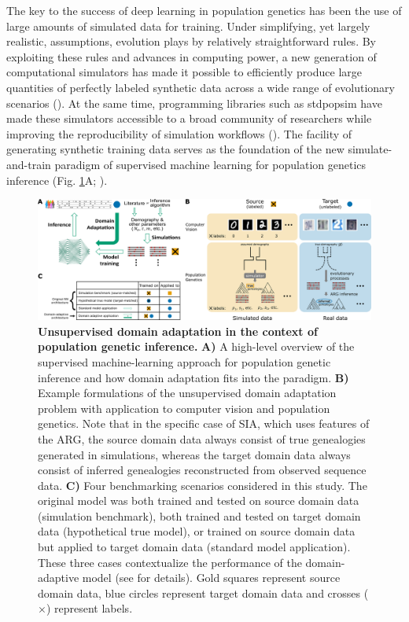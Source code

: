 The key to the success of deep learning in population genetics has been the use of large amounts of simulated data for training. Under simplifying, yet largely realistic, assumptions, evolution plays by relatively straightforward rules. By exploiting these rules and advances in computing power, a new generation of computational simulators has made it possible to efficiently produce large quantities of perfectly labeled synthetic data across a wide range of evolutionary scenarios (\cite{haller_tree-sequence_2019,haller_slim_2019,baumdicker_efficient_2022}). At the same time, programming libraries such as stdpopsim have made these simulators accessible to a broad community of researchers while improving the reproducibility of simulation workflows (\cite{adrion_community-maintained_2020,lauterbur_expanding_2022}). The facility of generating synthetic training data serves as the foundation of the new simulate-and-train paradigm of supervised machine learning for population genetics inference (Fig. \ref{fig:DA-F1}A; \cite{schrider_supervised_2018,korfmann_deep_2023,huang_harnessing_2023}).

\begin{figure}[h]
    \centering
    \includegraphics[width=\textwidth]{DA_figs/DA_F1.PNG}
    \caption[Unsupervised domain adaptation in the context of population genetic inference.]{\textbf{Unsupervised domain adaptation in the context of population genetic inference.} \textbf{A)} A high-level overview of the supervised machine-learning approach for population genetic inference and how domain adaptation fits into the paradigm. \textbf{B)} Example formulations of the unsupervised domain adaptation problem with application to computer vision and population genetics. Note that in the specific case of \ac{SIA}, which uses features of the \ac{ARG}, the source domain data always consist of true genealogies generated in simulations, whereas the target domain data always consist of inferred genealogies reconstructed from observed sequence data. \textbf{C)} Four benchmarking scenarios considered in this study. The original model was both trained and tested on source domain data (simulation benchmark), both trained and tested on target domain data (hypothetical true model), or trained on source domain data but applied to target domain data (standard model application). These three cases contextualize the performance of the domain-adaptive model (see  for details). Gold squares represent source domain data, blue circles represent target domain data and crosses ($\mathbf{\times}$) represent labels.}
    \label{fig:DA-F1}
\end{figure}

